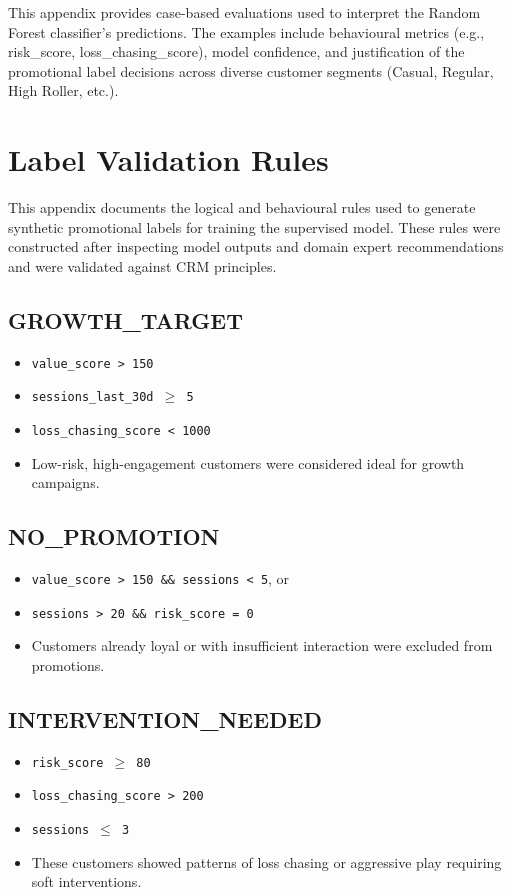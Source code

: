 \documentclass[12pt,a4paper]{report}
\begin{document}
This appendix provides case-based evaluations used to interpret the Random Forest classifier’s predictions. The examples include behavioural metrics (e.g., risk\_score, loss\_chasing\_score), model confidence, and justification of the promotional label decisions across diverse customer segments (Casual, Regular, High Roller, etc.).

\chapter{Label Validation Rules}
\label{appendix:validation_rules}

This appendix documents the logical and behavioural rules used to generate synthetic promotional labels for training the supervised model. These rules were constructed after inspecting model outputs and domain expert recommendations and were validated against CRM principles.

\section*{GROWTH\_TARGET}
\begin{itemize}
    \item \texttt{value\_score > 150}
    \item \texttt{sessions\_last\_30d $\geq$ 5}
    \item \texttt{loss\_chasing\_score < 1000}
    \item Low-risk, high-engagement customers were considered ideal for growth campaigns.
\end{itemize}

\section*{NO\_PROMOTION}
\begin{itemize}
    \item \texttt{value\_score > 150 \&\& sessions < 5}, or
    \item \texttt{sessions > 20 \&\& risk\_score = 0}
    \item Customers already loyal or with insufficient interaction were excluded from promotions.
\end{itemize}

\section*{INTERVENTION\_NEEDED}
\begin{itemize}
    \item \texttt{risk\_score $\geq$ 80}
    \item \texttt{loss\_chasing\_score > 200}
    \item \texttt{sessions $\leq$ 3}
    \item These customers showed patterns of loss chasing or aggressive play requiring soft interventions.
\end{itemize}
\end{document}
